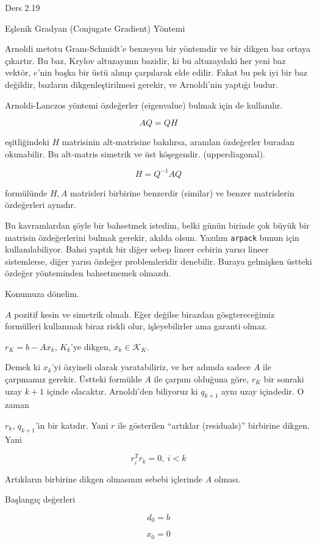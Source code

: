 \documentclass[12pt,fleqn]{article}\usepackage{../../common}
\begin{document}
Ders 2.19

Eşlenik Gradyan (Conjugate Gradient) Yöntemi 

Arnoldi metotu Gram-Schmidt'e benzeyen bir yöntemdir ve bir dikgen baz
ortaya çıkartır. Bu baz, Krylov altuzayının bazidir, ki bu altuzaydaki her
yeni baz vektör, $e$'nin başka bir üstü alınıp çarpılarak elde
edilir. Fakat bu pek iyi bir baz değildir, bazların dikgenleştirilmesi
gerekir, ve Arnoldi'nin yaptığı budur.

Arnoldi-Lanczos yöntemi özdeğerler (eigenvalue) bulmak için de kullanılır.

$$ AQ = QH $$

eşitliğindeki $H$ matrisinin alt-matrisine bakılırsa, aranılan özdeğerler
buradan okunabilir. Bu alt-matris simetrik ve üst köşegendir.
(upperdiagonal). 

$$ H = Q^{-1}AQ $$

formülünde $H,A$ matrisleri birbirine benzerdir (similar) ve benzer
matrislerin özdeğerleri aynıdır. 

Bu kavramlardan şöyle bir bahsetmek istedim, belki günün birinde çok büyük
bir matrisin özdeğerlerini bulmak gerekir, akılda olsun. Yazılım
\verb!arpack! bunun için kullanılabiliyor. Bahsi yaptık bir diğer sebep
lineer cebirin yarısı lineer sistemlerse, diğer yarısı özdeğer
problemleridir denebilir. Buraya gelmişken üstteki özdeğer yönteminden
bahsetmemek olmazdı.

Konumuza dönelim. 

$A$ pozitif kesin ve simetrik olmalı. Eğer değilse birazdan gösgtereceğimiz
formülleri kullanmak biraz riskli olur, işleyebilirler ama garanti olmaz. 

$r_K = b - Ax_k $, $K_k$'ye dikgen, $x_k \in \mathscr{K}_K$. 

Demek ki $x_k$'yi özyineli olarak yaratabiliriz, ve her adımda sadece $A$
ile çarpmamız gerekir. Üstteki formülde $A$ ile çarpım olduğuna göre, $r_K$
bir sonraki uzay $k+1$ içinde olacaktır. Arnoldi'den biliyoruz ki $q_{k+1}$
aynı uzay içindedir. O zaman 

$r_k$, $q_{k+1}$'in bir katıdır. Yani $r$ ile gösterilen ``artıklar
(residuals)'' birbirine dikgen. Yani 

$$ r_i^Tr_k = 0, \ i < k $$

Artıkların birbirine dikgen olmasının sebebi içlerinde $A$ olması. 

Başlangıç değerleri

$$ d_0 = b $$

$$ x_0 = 0 $$
\end{document}
